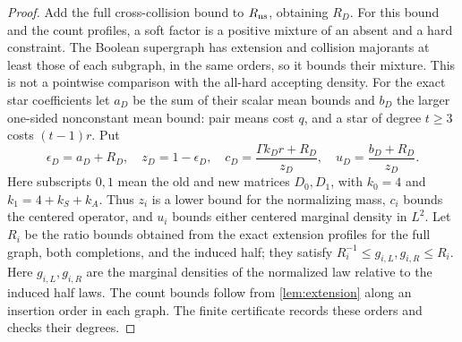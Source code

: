 \begin{proof}
Add the full cross-collision bound to $R_{\rm ns}$, obtaining $R_D$.
For this bound and the count profiles, a soft factor is a positive
mixture of an absent and a hard constraint. The Boolean supergraph
has extension and collision majorants at least those of each
subgraph, in the same orders, so it bounds their mixture. This is
not a pointwise comparison with the all-hard accepting density.
For the exact star coefficients let $a_D$ be the sum of their scalar
mean bounds and $b_D$ the larger one-sided nonconstant mean bound:
pair means cost $q$, and a star of degree $t\ge3$ costs $(t-1)r$.
Put
\[
 \epsilon_D=a_D+R_D,\quad z_D=1-\epsilon_D,\quad
 c_D=\frac{\Gamma k_Dr+R_D}{z_D},\quad
 u_D=\frac{b_D+R_D}{z_D}.
\]
Here subscripts $0,1$ mean the old and new matrices $D_0,D_1$,
with $k_0=4$ and $k_1=4+k_S+k_A$. Thus $z_i$ is a lower bound
for the normalizing mass, $c_i$ bounds the centered operator, and
$u_i$ bounds either centered marginal density in $L^2$.
Let $R_i$ be the ratio bounds obtained from the exact extension
profiles for the full graph, both completions, and the induced half;
they satisfy $R_i^{-1}\le g_{i,L},g_{i,R}\le R_i$.
Here $g_{i,L},g_{i,R}$ are the marginal densities of the normalized
law relative to the induced half laws. The count bounds follow from
\cref{lem:extension} along an insertion order in each graph.
The finite certificate records these orders and checks their degrees.


\end{proof}
